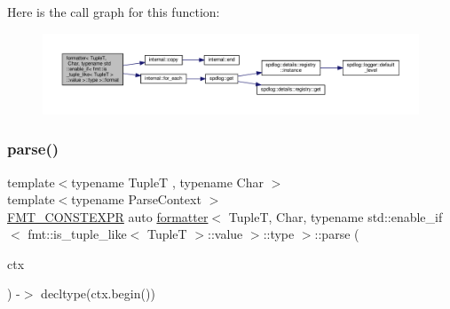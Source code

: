 Here is the call graph for this function\+:
\nopagebreak
\begin{figure}[H]
\begin{center}
\leavevmode
\includegraphics[width=350pt]{structformatter_3_01_tuple_t_00_01_char_00_01typename_01std_1_1enable__if_3_01fmt_1_1is__tuple__a8a88f793f5f612c28a21643fc88182d_a7d5dc29d45fc8f500059ce69020b2ea6_cgraph}
\end{center}
\end{figure}
\mbox{\label{structformatter_3_01_tuple_t_00_01_char_00_01typename_01std_1_1enable__if_3_01fmt_1_1is__tuple__a8a88f793f5f612c28a21643fc88182d_a7b66a353e2b9bf7e2806058857e03d90}} 
\subsubsection{\texorpdfstring{parse()}{parse()}}
{\footnotesize\ttfamily template$<$typename TupleT , typename Char $>$ \\
template$<$typename Parse\+Context $>$ \\
\hyperlink{core_8h_a69201cb276383873487bf68b4ef8b4cd}{F\+M\+T\+\_\+\+C\+O\+N\+S\+T\+E\+X\+PR} auto \hyperlink{structformatter}{formatter}$<$ TupleT, Char, typename std\+::enable\+\_\+if$<$ fmt\+::is\+\_\+tuple\+\_\+like$<$ TupleT $>$\+::value $>$\+::type $>$\+::parse (\begin{DoxyParamCaption}\item[{Parse\+Context \&}]{ctx }\end{DoxyParamCaption}) -\/$>$ decltype(ctx.\+begin()) \hspace{0.3cm}{\ttfamily [inline]}}



